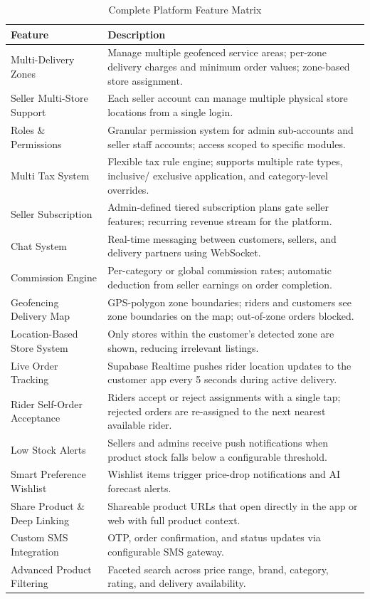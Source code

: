 \documentclass[12pt, a4paper, oneside]{report}
\begin{document}
\begin{table}[H]
\centering
\caption{Complete Platform Feature Matrix}
\label{tab:features-matrix}
\begin{tabularx}{\textwidth}{@{} L{4.5cm} X @{}}
\toprule
\textbf{Feature} & \textbf{Description} \\
\midrule
Multi-Delivery Zones
  & Manage multiple geofenced service areas; per-zone delivery charges
    and minimum order values; zone-based store assignment. \\[3pt]
Seller Multi-Store Support
  & Each seller account can manage multiple physical store locations
    from a single login. \\[3pt]
Roles \& Permissions
  & Granular permission system for admin sub-accounts and seller staff
    accounts; access scoped to specific modules. \\[3pt]
Multi Tax System
  & Flexible tax rule engine; supports multiple rate types, inclusive/
    exclusive application, and category-level overrides. \\[3pt]
Seller Subscription
  & Admin-defined tiered subscription plans gate seller features; recurring
    revenue stream for the platform. \\[3pt]
Chat System
  & Real-time messaging between customers, sellers, and delivery partners
    using WebSocket. \\[3pt]
Commission Engine
  & Per-category or global commission rates; automatic deduction from
    seller earnings on order completion. \\[3pt]
Geofencing Delivery Map
  & GPS-polygon zone boundaries; riders and customers see zone boundaries
    on the map; out-of-zone orders blocked. \\[3pt]
Location-Based Store System
  & Only stores within the customer's detected zone are shown, reducing
    irrelevant listings. \\[3pt]
Live Order Tracking
  & Supabase Realtime pushes rider location updates to the customer app
    every 5 seconds during active delivery. \\[3pt]
Rider Self-Order Acceptance
  & Riders accept or reject assignments with a single tap; rejected orders
    are re-assigned to the next nearest available rider. \\[3pt]
Low Stock Alerts
  & Sellers and admins receive push notifications when product stock falls
    below a configurable threshold. \\[3pt]
Smart Preference Wishlist
  & Wishlist items trigger price-drop notifications and AI forecast alerts. \\[3pt]
Share Product \& Deep Linking
  & Shareable product URLs that open directly in the app or web with
    full product context. \\[3pt]
Custom SMS Integration
  & OTP, order confirmation, and status updates via configurable SMS
    gateway. \\[3pt]
Advanced Product Filtering
  & Faceted search across price range, brand, category, rating, and
    delivery availability. \\
\bottomrule
\end{tabularx}
\end{table}
\end{document}

